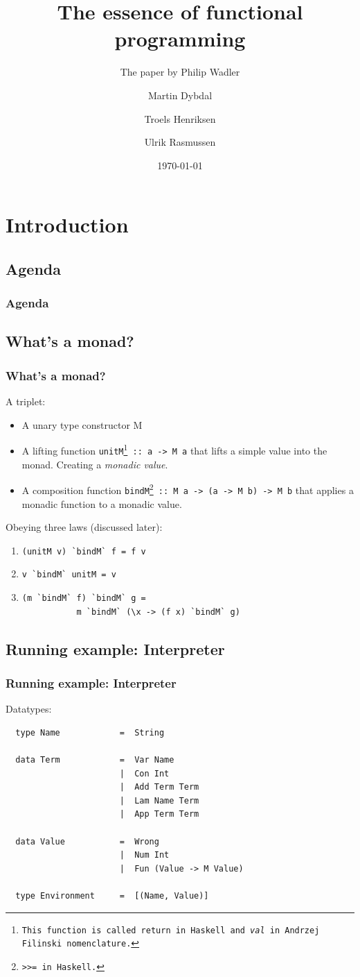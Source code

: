 \documentclass{beamer}
\title{The essence of functional programming}
\subtitle{The paper by Philip Wadler}
\author{Martin Dybdal \and Troels Henriksen \and Ulrik Rasmussen}
\institute{\textrm{Datalogisk Institut, Københavns Universitet}}
\date{\today}
\begin{document}
\frame{\titlepage}


\section{Introduction}
\subsection{Agenda}
\begin{frame}
  \frametitle{Agenda}
  \tableofcontents
\end{frame}

\subsection{What's a monad?}
\begin{frame}[fragile]
  \frametitle{What's a monad?}

  A triplet:
  \begin{itemize}
  \item<1-> A unary type constructor M
  \item<1-> A lifting function \texttt{unitM\footnote{This function is called \texttt{return} in
    Haskell and \textit{val} in Andrzej Filinski nomenclature.} :: a -> M a} that lifts a simple
    value into the monad. Creating a \textit{monadic
      value}. 
  \item<1-> A composition function \texttt{bindM\footnote{\texttt{>>=} in Haskell.} :: M a -> (a -> M b) -> M b}
     that applies a monadic function to a monadic value. 
  \end{itemize}
\pause
Obeying three laws (discussed later):
  \begin{enumerate}
  \item<2-> \lstinline{(unitM v) `bindM` f = f v}
  \item<2-> \lstinline{v `bindM` unitM = v}
  \item<2-> \begin{lstlisting}
(m `bindM` f) `bindM` g = 
           m `bindM` (\x -> (f x) `bindM` g)
          \end{lstlisting}
  \end{enumerate}
\end{frame}

\subsection{Running example: Interpreter}
\begin{frame}[t, fragile]
   \frametitle{Running example: Interpreter}
Datatypes:
\begin{lstlisting}
  type Name            =  String

  data Term            =  Var Name
                       |  Con Int
                       |  Add Term Term
                       |  Lam Name Term
                       |  App Term Term
  
  data Value           =  Wrong
                       |  Num Int
                       |  Fun (Value -> M Value)

  type Environment     =  [(Name, Value)]
\end{lstlisting}
\end{frame}
\end{document}
